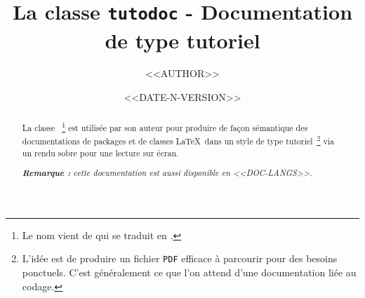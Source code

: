 \documentclass[10pt, a4paper]{../main/main}
\begin{document}
\title{La classe \texttt{tutodoc} - Documentation de type tutoriel}
\author{<<AUTHOR>>}
\date{<<DATE-N-VERSION>>}

\maketitle


\begin{abstract}
    La classe \thisproj{}\,%
    \footnote{
        Le nom vient de  qui se traduit en .
    }
    est utilisée par son auteur pour produire de façon sémantique des documentations de packages et de classes \LaTeX\ dans un style de type tutoriel\,%
    \footnote{
        L'idée est de produire un fichier \texttt{PDF} efficace à parcourir pour des besoins ponctuels. C'est généralement ce que l'on attend d'une documentation liée au codage.
    }
    via un rendu sobre pour une lecture sur écran.

    \smallskip

	\noindent
    \emph{\textbf{Remarque :} cette documentation est aussi disponible en <<DOC-LANGS>>.}
\end{abstract}
\end{document}
